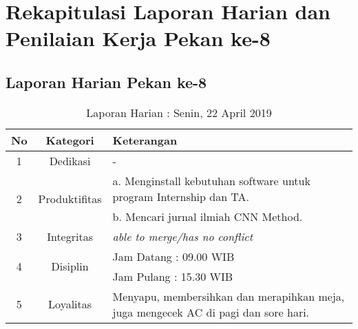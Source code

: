\section{Rekapitulasi Laporan Harian dan Penilaian Kerja Pekan ke-8}

\subsection{Laporan Harian Pekan ke-8}

\begin{table}[htp]
\begin{center}
\caption{Laporan Harian : Senin, 22 April 2019}
\label{tab:lh220419}
\begin{tabularx}{\textwidth}{|l|l|X|}
\hline
\multicolumn{1}{|c|}{\textbf{No}} & \multicolumn{1}{c|}{\textbf{Kategori}} & \textbf{Keterangan} \\ \hline
\multicolumn{1}{|c|}{\multirow{1}{*}{1}} & \multicolumn{1}{c|}{\multirow{1}{*}{\parbox{2.5cm}{Dedikasi}}}
& -\\
\hline
\multicolumn{1}{|c|}{\multirow{2}{*}{2}} & \multicolumn{1}{c|}{\multirow{2}{*}{\parbox{2.5cm}{Produktifitas}}}
& a. Menginstall kebutuhan software untuk program Internship dan TA.\\
\multicolumn{1}{|c|}{\multirow{1}{*}{}} & \multicolumn{1}{c|}{\multirow{1}{*}{\parbox{2.5cm}{}}}
& b. Mencari jurnal ilmiah CNN Method.\\
\hline
\multicolumn{1}{|c|}{\multirow{1}{*}{3}} & \multicolumn{1}{c|}{\multirow{1}{*}{\parbox{2.5cm}{Integritas}}}
& \textit{able to merge/has no conflict} \\
\hline
\multicolumn{1}{|c|}{\multirow{2}{*}{4}} & \multicolumn{1}{c|}{\multirow{2}{*}{\parbox{2.5cm}{Disiplin}}}
& Jam Datang : 09.00 WIB \\
\multicolumn{1}{|c|}{\multirow{1}{*}{}} & \multicolumn{1}{c|}{\multirow{1}{*}{\parbox{2.5cm}{}}}
& Jam Pulang : 15.30 WIB \\
\hline
\multicolumn{1}{|c|}{\multirow{2}{*}{5}} & \multicolumn{1}{c|}{\multirow{2}{*}{\parbox{2.5cm}{Loyalitas}}}
& Menyapu, membersihkan dan merapihkan meja, juga mengecek AC di pagi dan sore hari.\\
\hline
\end{tabularx}
\end{center}
\end{table}

